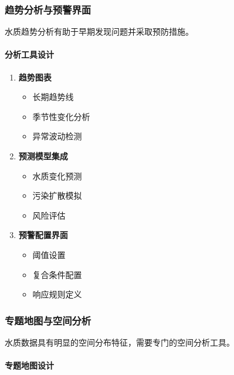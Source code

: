 \subsubsection{趋势分析与预警界面}\label{ux8d8bux52bfux5206ux6790ux4e0eux9884ux8b66ux754cux9762}

水质趋势分析有助于早期发现问题并采取预防措施。

\paragraph{分析工具设计}\label{ux5206ux6790ux5de5ux5177ux8bbeux8ba1}

\begin{enumerate}
\def\labelenumi{\arabic{enumi}.}
\tightlist
\item
  \textbf{趋势图表}

  \begin{itemize}
  \tightlist
  \item
    长期趋势线
  \item
    季节性变化分析
  \item
    异常波动检测
  \end{itemize}
\item
  \textbf{预测模型集成}

  \begin{itemize}
  \tightlist
  \item
    水质变化预测
  \item
    污染扩散模拟
  \item
    风险评估
  \end{itemize}
\item
  \textbf{预警配置界面}

  \begin{itemize}
  \tightlist
  \item
    阈值设置
  \item
    复合条件配置
  \item
    响应规则定义
  \end{itemize}
\end{enumerate}

\subsubsection{专题地图与空间分析}\label{ux4e13ux9898ux5730ux56feux4e0eux7a7aux95f4ux5206ux6790}

水质数据具有明显的空间分布特征，需要专门的空间分析工具。

\paragraph{专题地图设计}\label{ux4e13ux9898ux5730ux56feux8bbeux8ba1}

